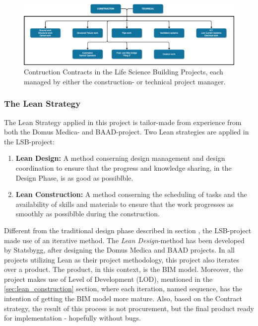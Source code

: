 \begin{figure}
    \centering
    \includegraphics[width=\textwidth]{fig/LVB_contracts.png}
    \caption{Contruction Contracts in the Life Science Building Projects, each managed by either the construction- or technical project manager.}
    \label{fig:project_contracts}
\end{figure}

\subsubsection*{The Lean Strategy}
The Lean Strategy applied in this project is tailor-made from experience from both the Domus Medica- and BAAD-project. Two Lean strategies are applied in the LSB-project: 

\begin{enumerate}
    \item \textbf{Lean Design:} A method conserning design management and design coordination to ensure that the progress and knowledge sharing, in the Design Phase, is as good as possiblble.
    \item \textbf{Lean Construction:} A method conserning the scheduling
    of tasks and the availability of skills and materials to ensure that the work progresses as smoothly as possiblble during the construction.
\end{enumerate}

Different from the traditional design phase described in section , the LSB-project made use of an iterative method. The \textit{Lean Design}-method has been developed by Statsbygg, after designing the Domus Medica and BAAD projects. In all projects utilizing Lean as their project methodology, this project also iterates over a product. The product, in this context, is the BIM model. Moreover, the project makes use of Level of Development (LOD), mentioned in the \ref{sec:lean_construction} section, where each iteration, named sequence, has the intention of getting the BIM model more mature. Also, based on the Contract strategy, the result of this process is not procurement, but the final product ready for implementation - hopefully without bugs. 

